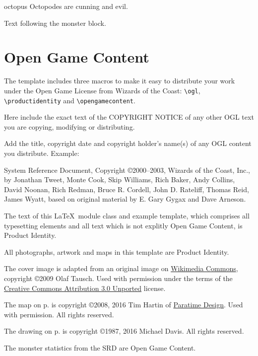 \documentclass[a4paper,serif]{module}
\begin{document}
\begin{newmonster}{octopus}
Octopodes are cunning and evil.
\end{newmonster}

Text following the monster block.

%
%

\section{Open Game Content}
\label{ogl}

The template includes three macros to make it easy to distribute your work under the Open Game License
from Wizards of the Coast: \verb|\ogl|, \verb|\productidentity| and \verb|\opengamecontent|.

\begin{ogl}
\item Here include the exact text of the COPYRIGHT NOTICE of any other OGL text you are copying, modifying or distributing.
\item Add the title, copyright date and copyright holder's name(s) of any OGL content you distribute. Example:
\item System Reference Document, Copyright \copyright 2000--2003, Wizards of the Coast, Inc., by Jonathan Tweet, Monte Cook,
Skip Williams, Rich Baker, Andy Collins, David Noonan, Rich Redman, Bruce R. Cordell, John D. Rateliff, Thomas Reid, James
Wyatt, based on original material by E. Gary Gygax and Dave Arneson.
\end{ogl}

\begin{productidentity}
\item The text of this \LaTeX~module class and example template, which comprises all typesetting elements and all text which
is not explitly Open Game Content, is Product Identity.
\modulecopyright

\item All photographs, artwork and maps in this template are Product Identity.

\item The cover image is adapted from an original image on
\href{https://commons.wikimedia.org/wiki/File:Karnak_Tempel_Vorhof_05.jpg}{Wikimedia Commons}, copyright \copyright 2009 Olaf
Tausch. Used with permission under the terms of the
\href{https://creativecommons.org/licenses/by/3.0/deed.en}{Creative Commons Attribution 3.0 Unported} license.

\item The map on p.\pageref{img:map} is copyright \copyright 2008, 2016 Tim Hartin of \href{http://paratime.ca}{Paratime Design}.
Used with permission. All rights reserved.

\item The drawing on p.\pageref{img:tomb} is copyright \copyright 1987, 2016 Michael Davis. All rights reserved.
\end{productidentity}

\begin{opengamecontent}
\item The monster statistics from the SRD are Open Game Content.
\end{opengamecontent}

%
%

\tableofcontents

\end{document}
